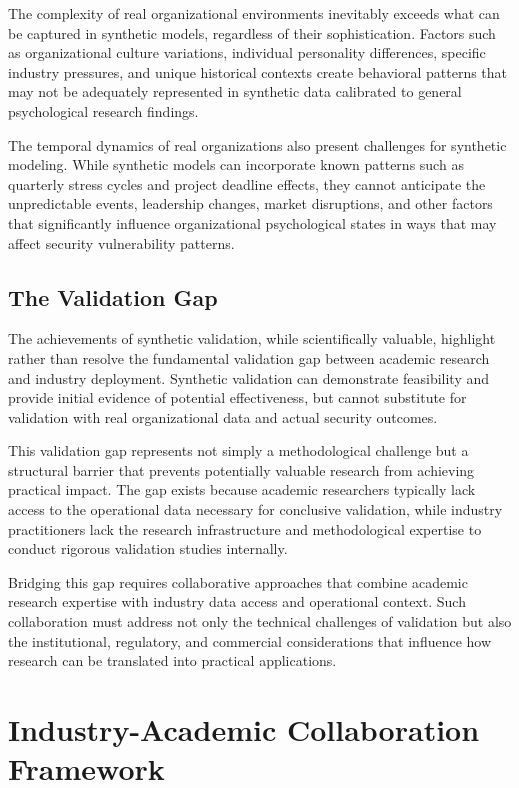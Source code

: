 \documentclass[10pt,twocolumn]{IEEEtran}
\begin{document}
The complexity of real organizational environments inevitably exceeds what can be captured in synthetic models, regardless of their sophistication. Factors such as organizational culture variations, individual personality differences, specific industry pressures, and unique historical contexts create behavioral patterns that may not be adequately represented in synthetic data calibrated to general psychological research findings.

The temporal dynamics of real organizations also present challenges for synthetic modeling. While synthetic models can incorporate known patterns such as quarterly stress cycles and project deadline effects, they cannot anticipate the unpredictable events, leadership changes, market disruptions, and other factors that significantly influence organizational psychological states in ways that may affect security vulnerability patterns.

\subsection{The Validation Gap}

The achievements of synthetic validation, while scientifically valuable, highlight rather than resolve the fundamental validation gap between academic research and industry deployment. Synthetic validation can demonstrate feasibility and provide initial evidence of potential effectiveness, but cannot substitute for validation with real organizational data and actual security outcomes.

This validation gap represents not simply a methodological challenge but a structural barrier that prevents potentially valuable research from achieving practical impact. The gap exists because academic researchers typically lack access to the operational data necessary for conclusive validation, while industry practitioners lack the research infrastructure and methodological expertise to conduct rigorous validation studies internally.

Bridging this gap requires collaborative approaches that combine academic research expertise with industry data access and operational context. Such collaboration must address not only the technical challenges of validation but also the institutional, regulatory, and commercial considerations that influence how research can be translated into practical applications.

\section{Industry-Academic Collaboration Framework}
\end{document}
